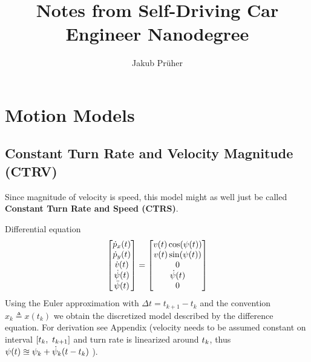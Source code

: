 \documentclass[a4paper,11pt]{article}
\title{Notes from Self-Driving Car Engineer Nanodegree}
\author{Jakub Prüher}
\begin{document}
	\maketitle
	\section{Motion Models}
	
	\subsection{Constant Turn Rate and Velocity Magnitude (CTRV)}
	Since magnitude of velocity is speed, this model might as well just be called \textbf{Constant Turn Rate and Speed (CTRS)}.

	Differential equation
	\begin{equation}
		\bmqty{
			\dot{p}_x(t) \\
			\dot{p}_y(t) \\
			\dot{v}(t) \\
			\dot{\psi}(t) \\
			\ddot{\psi}(t)
		}
		=
		\bmqty{
			v(t)\cos(\psi(t)) \\
			v(t)\sin(\psi(t)) \\
			0 \\
			\dot{\psi}(t) \\
			0
		}
	\end{equation}
	Using the Euler approximation with \( \Delta t =  t_{k+1} - t_k \)  and the convention \( x_k \triangleq x(t_k) \) we obtain the discretized model described by the difference equation.
	For derivation see Appendix (velocity needs to be assumed constant on interval \( [t_k,\ t_{k+1}] \) and turn rate is linearized around \( t_k \), thus \( \psi(t) \approxeq \psi_k + \dot{\psi}_k (t - t_k) \) ).
	
\end{document}
